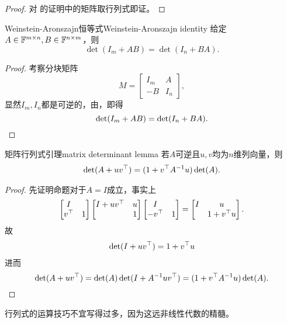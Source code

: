 \begin{proof}
	对 的证明中的矩阵取行列式即证。
\end{proof}

\begin{theorem}
	{Weinstein-Aronszajn恒等式}{Weinstein-Aronszajn identity}
	给定$A\in\mathbb F^{m\times n},B\in\mathbb F^{n\times m}$，则 
	\begin{equation}
		\det(I_m+AB)=\det(I_n+BA).
	\end{equation}
\end{theorem}
\begin{proof}
	考察分块矩阵
	\[
		M=\begin{bmatrix}
			I_m&A\\-B&I_n
		\end{bmatrix},
	\]
	显然$I_m,I_n$都是可逆的，由，即得
	\[
		\det(I_m+AB)=\det(I_n+BA).
		\qedhere
	\]
\end{proof}


\begin{theorem}
	{矩阵行列式引理}{matrix determinant lemma}
	若$A$可逆且$u,v$均为$n$维列向量，则
	\begin{align}
		\det(A+uv^\top)=(1+v^\top A^{-1} u)\det(A).
	\end{align}
\end{theorem}
\begin{proof}
	先证明命题对于$A=I$成立，事实上
	\begin{align*}
		\begin{bmatrix}
			I\\v^\top&1
		\end{bmatrix}
		\begin{bmatrix}
			I+uv^\top&u\\ &1
		\end{bmatrix}
		\begin{bmatrix}
			I\\-v^\top&1
		\end{bmatrix}=
		\begin{bmatrix}
			I&u\\ &1+v^\top u
		\end{bmatrix}.
	\end{align*}
	故
	\begin{align}
		\det(I+uv^\top)=1+v^\top u
	\end{align}
	进而 
	\[
		\det(A+uv^\top)=\det(A)\det(I+A^{-1} uv^\top)=(1+v^\top A^{-1} u)\det(A).
		\qedhere
	\]
\end{proof}
\begin{remark}
	行列式的运算技巧不宜写得过多，因为这远非线性代数的精髓。
\end{remark}
